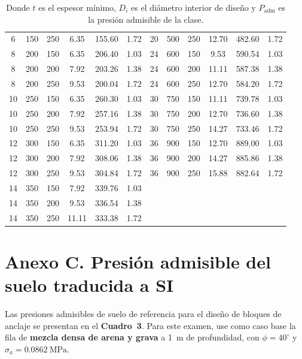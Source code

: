 \begin{table}[htbp]
\begin{tabular}{cccccc|cccccc}
6  & 150 & 250 & 6.35  & 155.60 & 1.72 & 20 & 500 & 250 & 12.70 & 482.60 & 1.72 \\
8  & 200 & 150 & 6.35  & 206.40 & 1.03 & 24 & 600 & 150 & 9.53  & 590.54 & 1.03 \\
8  & 200 & 200 & 7.92  & 203.26 & 1.38 & 24 & 600 & 200 & 11.11 & 587.38 & 1.38 \\
8  & 200 & 250 & 9.53  & 200.04 & 1.72 & 24 & 600 & 250 & 12.70 & 584.20 & 1.72 \\
10 & 250 & 150 & 6.35  & 260.30 & 1.03 & 30 & 750 & 150 & 11.11 & 739.78 & 1.03 \\
10 & 250 & 200 & 7.92  & 257.16 & 1.38 & 30 & 750 & 200 & 12.70 & 736.60 & 1.38 \\
10 & 250 & 250 & 9.53  & 253.94 & 1.72 & 30 & 750 & 250 & 14.27 & 733.46 & 1.72 \\
12 & 300 & 150 & 6.35  & 311.20 & 1.03 & 36 & 900 & 150 & 12.70 & 889.00 & 1.03 \\
12 & 300 & 200 & 7.92  & 308.06 & 1.38 & 36 & 900 & 200 & 14.27 & 885.86 & 1.38 \\
12 & 300 & 250 & 9.53  & 304.84 & 1.72 & 36 & 900 & 250 & 15.88 & 882.64 & 1.72 \\
14 & 350 & 150 & 7.92  & 339.76 & 1.03 &    &     &     &       &        &      \\
14 & 350 & 200 & 9.53  & 336.54 & 1.38 &    &     &     &       &        &      \\
14 & 350 & 250 & 11.11 & 333.38 & 1.72 &    &     &     &       &        &      \\
\bottomrule
\end{tabular}
\caption*{\footnotesize Donde $t$ es el espesor mínimo, $D_i$ es el diámetro interior de diseño y $P_{\mathrm{adm}}$ es la presión admisible de la clase.}
\end{table}

\clearpage
\section*{Anexo C. Presión admisible del suelo traducida a SI}

\begin{infobox}
Las presiones admisibles de suelo de referencia para el diseño de bloques de anclaje se presentan en el \textbf{Cuadro~3}. Para este examen, use como caso base la fila de \textbf{mezcla densa de arena y grava} a \SI{1}{\meter} de profundidad, con $\phi = 40^\circ$ y $\sigma_a = \SI{0.0862}{\mega\pascal}$.
\end{infobox}

